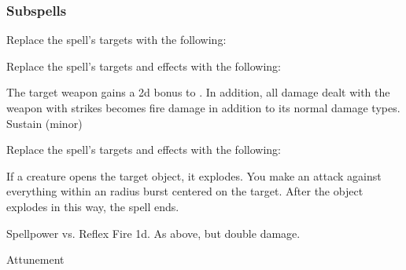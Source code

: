 \subsubsection{Subspells}
Replace the spell's targets with the following:
\begin{spellcontent}
\begin{augmenttargetinginfo}
\end{augmenttargetinginfo}
\end{spellcontent}
Replace the spell's targets and effects with the following:
\begin{spellcontent}
\begin{augmenttargetinginfo}
\end{augmenttargetinginfo}
\begin{augmenteffects}
\spelleffect
The target weapon gains a \plus2d bonus to .
In addition, all damage dealt with the weapon with strikes becomes fire damage in addition to its normal damage types.
\spelldur Sustain (minor)
\end{augmenteffects}
\end{spellcontent}
Replace the spell's targets and effects with the following:
\begin{spellcontent}
\begin{augmenttargetinginfo}
\end{augmenttargetinginfo}
\begin{augmenteffects}
\spelleffect
If a creature opens the target object, it explodes.
You make an attack against everything within an \areamed radius burst centered on the target.
After the object explodes in this way, the spell ends.
\begin{spellattack}{Spellpower vs. Reflex}
\spellsuccess Fire  \minus1d.
\spellcritical As above, but double damage.
\end{spellattack}
\spelldur Attunement
\end{augmenteffects}
\end{spellcontent}

